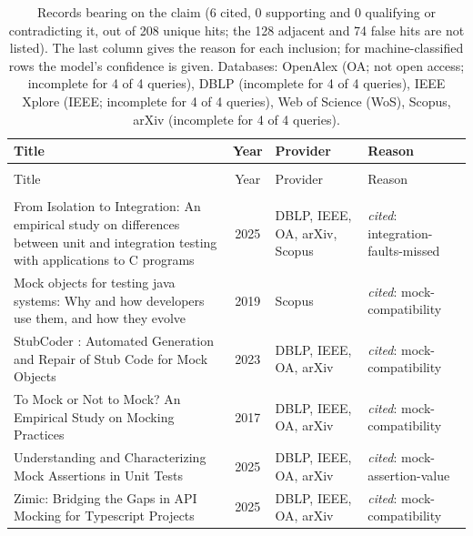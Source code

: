 
\begingroup\footnotesize
\begin{longtable}{@{}%
  >{\raggedright\arraybackslash}p{}c%
  >{\raggedright\arraybackslash}p{}%
  >{\raggedright\arraybackslash}p{}@{}}
\caption{Records bearing on the claim (6 cited, 0 supporting and 0 qualifying or contradicting it, out of 208 unique hits; the 128 adjacent and 74 false hits are not listed). The last column gives the reason for each inclusion; for machine-classified rows the model's confidence is given. Databases: OpenAlex (OA; not open access; incomplete for 4 of 4 queries), DBLP (incomplete for 4 of 4 queries), IEEE Xplore (IEEE; incomplete for 4 of 4 queries), Web of Science (WoS), Scopus, arXiv (incomplete for 4 of 4 queries).}\label{tab:t-mocks-diverge}\\
\toprule
Title & Year & Provider & Reason \\
\midrule
\endfirsthead
\multicolumn{4}{@{}l}{\emph{\tablename~\thetable{} (cont.)}}\\
\toprule
Title & Year & Provider & Reason \\
\midrule
\endhead
\midrule \multicolumn{4}{r@{}}{\emph{continued on next page}}\\
\endfoot
\bottomrule
\endlastfoot
From Isolation to Integration: An empirical study on differences between unit and integration testing with applications to C programs & 2025 & DBLP, IEEE, OA, arXiv, Scopus & \emph{cited}: integration-faults-missed \\
Mock objects for testing java systems: Why and how developers use them, and how they evolve & 2019 & Scopus & \emph{cited}: mock-compatibility \\
StubCoder : Automated Generation and Repair of Stub Code for Mock Objects & 2023 & DBLP, IEEE, OA, arXiv & \emph{cited}: mock-compatibility \\
To Mock or Not to Mock? An Empirical Study on Mocking Practices & 2017 & DBLP, IEEE, OA, arXiv & \emph{cited}: mock-compatibility \\
Understanding and Characterizing Mock Assertions in Unit Tests & 2025 & DBLP, IEEE, OA, arXiv & \emph{cited}: mock-assertion-value \\
Zimic: Bridging the Gaps in API Mocking for Typescript Projects & 2025 & DBLP, IEEE, OA, arXiv & \emph{cited}: mock-compatibility \\
\end{longtable}
\endgroup
